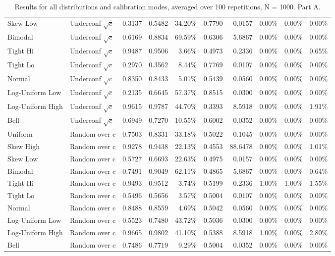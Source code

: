 \documentclass{article}
\theoremstyle{plain}
\theoremstyle{definition}
\theoremstyle{remark}
\begin{document}
\begin{table}[ht]
\begin{tabular}{llrrrrrrrr}
Skew Low & Underconf $\sqrt{c}$ & 0.3137 & 0.5482 & 34.20\% & 0.7790 & 0.0157 & 0.00\% & 0.00\% & 0.00\% \\
Bimodal & Underconf $\sqrt{c}$ & 0.6169 & 0.8834 & 69.59\% & 0.6306 & 5.6867 & 0.00\% & 0.00\% & 0.00\% \\
Tight Hi & Underconf $\sqrt{c}$ & 0.9487 & 0.9506 & 3.66\% & 0.4973 & 0.2336 & 0.00\% & 0.00\% & 0.65\% \\
Tight Lo & Underconf $\sqrt{c}$ & 0.2970 & 0.3562 & 8.44\% & 0.7769 & 0.0107 & 0.00\% & 0.00\% & 0.00\% \\
Normal & Underconf $\sqrt{c}$ & 0.8350 & 0.8433 & 5.01\% & 0.5439 & 0.0560 & 0.00\% & 0.00\% & 0.00\% \\
Log-Uniform Low & Underconf $\sqrt{c}$ & 0.2135 & 0.6645 & 57.37\% & 0.8515 & 0.0300 & 0.00\% & 0.00\% & 0.00\% \\
Log-Uniform High & Underconf $\sqrt{c}$ & 0.9615 & 0.9787 & 44.70\% & 0.3393 & 8.5918 & 0.00\% & 0.00\% & 1.91\% \\
Bell & Underconf $\sqrt{c}$ & 0.6949 & 0.7270 & 10.55\% & 0.6002 & 0.0352 & 0.00\% & 0.00\% & 0.00\% \\
Uniform & Random over c & 0.7503 & 0.8331 & 33.18\% & 0.5022 & 0.1045 & 0.00\% & 0.00\% & 0.00\% \\
Skew High & Random over c & 0.9278 & 0.9438 & 22.13\% & 0.4553 & 88.6478 & 0.00\% & 0.00\% & 1.01\% \\
Skew Low & Random over c & 0.5727 & 0.6693 & 22.63\% & 0.4975 & 0.0157 & 0.00\% & 0.00\% & 0.00\% \\
Bimodal & Random over c & 0.7491 & 0.9049 & 62.11\% & 0.4865 & 5.6867 & 0.00\% & 0.00\% & 0.64\% \\
Tight Hi & Random over c & 0.9493 & 0.9512 & 3.74\% & 0.5199 & 0.2336 & 1.00\% & 1.00\% & 1.55\% \\
Tight Lo & Random over c & 0.5496 & 0.5656 & 3.57\% & 0.5004 & 0.0107 & 0.00\% & 0.00\% & 0.00\% \\
Normal & Random over c & 0.8488 & 0.8559 & 4.69\% & 0.5042 & 0.0560 & 0.00\% & 0.00\% & 0.00\% \\
Log-Uniform Low & Random over c & 0.5523 & 0.7480 & 43.72\% & 0.5036 & 0.0300 & 0.00\% & 0.00\% & 0.00\% \\
Log-Uniform High & Random over c & 0.9665 & 0.9802 & 41.10\% & 0.5388 & 8.5918 & 1.00\% & 0.00\% & 2.80\% \\
Bell & Random over c & 0.7486 & 0.7719 & 9.29\% & 0.5004 & 0.0352 & 0.00\% & 0.00\% & 0.00\% \\
\bottomrule
\end{tabular}
\caption{Results for all distributions and calibration modes, averaged over 100 repetitions, N = 1000. Part A. }
\label{tab:report_all_indicators_A}
\end{table}
\end{document}
